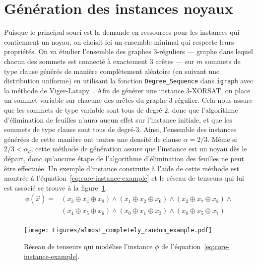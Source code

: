 \section{Génération des instances noyaux}\label{sec:core-instances}
Puisque le principal souci est la demande en ressources pour les instances qui contiennent un noyau, on choisit ici un ensemble minimal qui respecte leurs propriétés.
On va étudier l'ensemble des graphes $3$-réguliers --- graphe dans lequel chacun des sommets est connecté à exactement $3$ arêtes --- sur $m$ sommets de type clause générés de manière complètement aléatoire (en suivant une distribution uniforme) en utilisant la fonction \verb|Degree_Sequence| dans \verb|igraph| avec la méthode de Viger-Latapy~\cite{viger_efficient_2016}.
Afin de générer une instance $3$-XORSAT, on place un sommet variable sur chacune des arêtes du graphe $3$-régulier.
Cela nous assure que les sommets de type variable sont tous de degré-$2$, donc que l'algorithme d'élimination de feuilles n'aura aucun effet sur l'instance initiale, et que les sommets de type clause sont tous de degré-$3$.
Ainsi, l'ensemble des instances générées de cette manière ont toutes une densité de clause $\alpha = 2/3$.
Même si $2/3 < \alpha_d$, cette méthode de génération assure que l'instance est un noyau dès le départ, donc qu'aucune étape de l'algorithme d'élimination des feuilles ne peut être effectuée.
Un exemple d'instance construite à l'aide de cette méthode est montrée à l'équation~\ref{eq:core-instance-example} et le réseau de tenseurs qui lui est associé se trouve à la figure~\ref{fig:core-instance-example}.
\begin{equation}\label{eq:core-instance-example}
    \begin{split}
        \phi(\vec{x}) = &(x_3 \oplus x_4 \oplus x_8) \wedge (x_1 \oplus x_2 \oplus x_6) \wedge (x_2 \oplus x_7 \oplus x_8) \wedge\\
        &(x_4 \oplus x_5 \oplus x_6) \wedge (x_0 \oplus x_1 \oplus x_3) \wedge (x_0 \oplus x_5 \oplus x_7)\\
    \end{split}
  \end{equation}
\begin{figure}[h]
    \centering
    \texttt{[image: Figures/almost\_completely\_random\_example.pdf]}
    \caption{Réseau de tenseurs qui modélise l'instance $\phi$ de l'équation~\ref{eq:core-instance-example}.}
    \label{fig:core-instance-example}
\end{figure}
